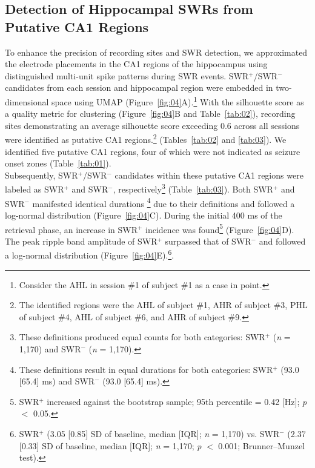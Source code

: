 \documentclass[preprint,review,12pt]{elsarticle}%
\begin{document}
\subsection{Detection of Hippocampal SWRs from Putative CA1 Regions}
To enhance the precision of recording sites and SWR detection, we approximated the electrode placements in the CA1 regions of the hippocampus using distinguished multi-unit spike patterns during SWR events. SWR$^+$/SWR$^-$ candidates from each session and hippocampal region were embedded in two-dimensional space using UMAP (Figure~\ref{fig:04}A).\footnote{Consider the AHL in session \#1 of subject \#1 as a case in point.} With the silhouette score as a quality metric for clustering (Figure~\ref{fig:04}B and Table~\ref{tab:02}), recording sites demonstrating an average silhouette score exceeding 0.6 across all sessions were identified as putative CA1 regions.\footnote{The identified regions were the AHL of subject \#1, AHR of subject \#3, PHL of subject \#4, AHL of subject \#6, and AHR of subject \#9.} (Tables~\ref{tab:02} and \ref{tab:03}). We identified five putative CA1 regions, four of which were not indicated as seizure onset zones (Table~\ref{tab:01}).
\\
\indent
Subsequently, SWR$^+$/SWR$^-$ candidates within these putative CA1 regions were labeled as SWR$^+$ and SWR$^-$, respectively\footnote{These definitions produced equal counts for both categories: SWR$^+$ (\textit{n} = 1,170) and SWR$^-$ (\textit{n} = 1,170).} (Table~\ref{tab:03}). Both SWR$^+$ and SWR$^-$ manifested identical durations \footnote{These definitions result in equal durations for both categories: SWR$^+$ (93.0 [65.4] ms) and SWR$^-$ (93.0 [65.4] ms).} due to their definitions and followed a log-normal distribution (Figure~\ref{fig:04}C). During the initial 400 ms of the retrieval phase, an increase in SWR$^+$ incidence was found\footnote{SWR$^+$ increased against the bootstrap sample; 95th percentile = 0.42 [Hz]; \textit{p} $<$ 0.05.} (Figure~\ref{fig:04}D). The peak ripple band amplitude of SWR$^+$ surpassed that of SWR$^-$ and followed a log-normal distribution (Figure~\ref{fig:04}E).\footnote{SWR$^+$ (3.05 [0.85] SD of baseline, median [IQR]; \textit{n} = 1,170) vs. SWR$^-$ (2.37 [0.33] SD of baseline, median [IQR]; \textit{n} = 1,170; \textit{p} $<$ 0.001; Brunner--Munzel test).}.
\end{document}
